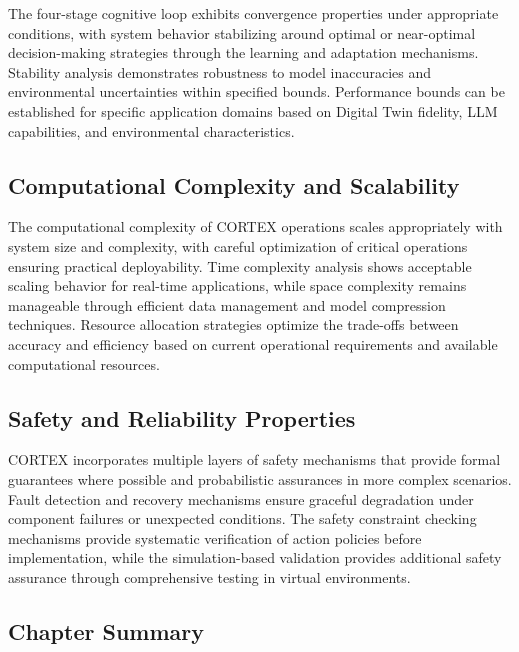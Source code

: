 The four-stage cognitive loop exhibits convergence properties under appropriate conditions, with system behavior stabilizing around optimal or near-optimal decision-making strategies through the learning and adaptation mechanisms. Stability analysis demonstrates robustness to model inaccuracies and environmental uncertainties within specified bounds. Performance bounds can be established for specific application domains based on Digital Twin fidelity, LLM capabilities, and environmental characteristics.

\subsection{Computational Complexity and Scalability}

The computational complexity of CORTEX operations scales appropriately with system size and complexity, with careful optimization of critical operations ensuring practical deployability. Time complexity analysis shows acceptable scaling behavior for real-time applications, while space complexity remains manageable through efficient data management and model compression techniques. Resource allocation strategies optimize the trade-offs between accuracy and efficiency based on current operational requirements and available computational resources.

\subsection{Safety and Reliability Properties}

CORTEX incorporates multiple layers of safety mechanisms that provide formal guarantees where possible and probabilistic assurances in more complex scenarios. Fault detection and recovery mechanisms ensure graceful degradation under component failures or unexpected conditions. The safety constraint checking mechanisms provide systematic verification of action policies before implementation, while the simulation-based validation provides additional safety assurance through comprehensive testing in virtual environments.

\subsection{Chapter Summary}

